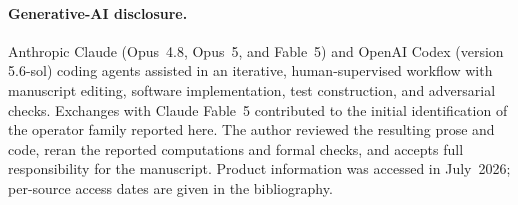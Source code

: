 \documentclass[man,12pt,floatsintext,donotrepeattitle]{apa7}
\begin{document}
\paragraph{Generative-AI disclosure.} Anthropic Claude (Opus~4.8, Opus~5, and
Fable~5) and OpenAI Codex (version 5.6-sol) coding agents
\parencite{anthropic_claude,anthropic_fable,openai_codex} assisted in an
iterative, human-supervised workflow with manuscript editing, software
implementation, test construction, and adversarial checks. Exchanges with
Claude Fable~5 contributed to the initial identification of the operator family
reported here. The author reviewed the resulting prose and code, reran the
reported computations and formal checks, and accepts full responsibility for
the manuscript. Product information was accessed in July~2026; per-source
access dates are given in the bibliography.

\printbibliography
\end{document}
